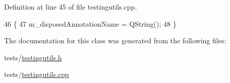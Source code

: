 Definition at line 45 of file testingutils.\+cpp.


\begin{DoxyCode}
46     \{
47         m\_disposedAnnotationName = QString();
48     \}
\end{DoxyCode}


The documentation for this class was generated from the following files\+:\begin{DoxyCompactItemize}
\item 
tests/\hyperlink{testingutils_8h}{testingutils.\+h}\item 
tests/\hyperlink{testingutils_8cpp}{testingutils.\+cpp}\end{DoxyCompactItemize}
